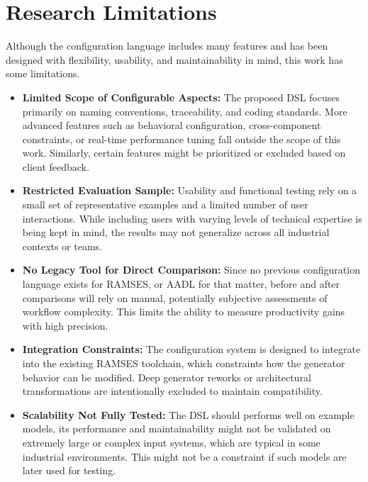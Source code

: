 \section{Research Limitations}
\label{sec:research_limitations}

Although the configuration language includes many features and has been designed with flexibility, usability, and maintainability in mind, this work has some limitations.

\begin{itemize}
	\item \textbf{Limited Scope of Configurable Aspects:} The proposed DSL focuses primarily on naming conventions, traceability, and coding standards. More advanced features such as behavioral configuration, cross-component constraints, or real-time performance tuning fall outside the scope of this work. Similarly, certain features might be prioritized or excluded based on client feedback.
	
	\item \textbf{Restricted Evaluation Sample:} Usability and functional testing rely on a small set of representative examples and a limited number of user interactions. While including users with varying levels of technical expertise is being kept in mind, the results may not generalize across all industrial contexts or teams.
	
	\item \textbf{No Legacy Tool for Direct Comparison:} Since no previous configuration language exists for \gls{RAMSES}, or AADL for that matter, before and after comparisons will rely on manual, potentially subjective assessments of workflow complexity. This limits the ability to measure productivity gains with high precision.
	
	\item \textbf{Integration Constraints:} The configuration system is designed to integrate into the existing \gls{RAMSES} toolchain, which constraints how the generator behavior can be modified. Deep generator reworks or architectural transformations are intentionally excluded to maintain compatibility.
	
	\item \textbf{Scalability Not Fully Tested:} The \gls{DSL} should performs well on example models, its performance and maintainability might not be validated on extremely large or complex input systems, which are typical in some industrial environments. This might not be a constraint if such models are later used for testing.
	
\end{itemize}

